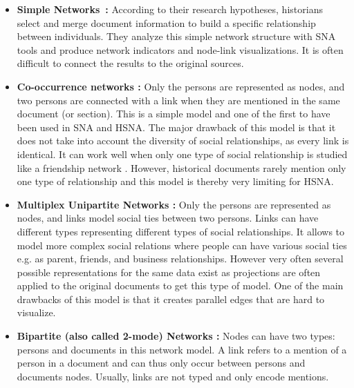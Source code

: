 \begin{itemize}[nosep,leftmargin=*]
    \item \textbf{Simple Networks~\cite{wetherellHistoricalSocialNetwork1998}:} According to their research hypotheses, historians select and merge document information to build a specific relationship between individuals. They analyze this simple network structure with SNA tools and produce network indicators and node-link visualizations. It is often difficult to connect the results to the original sources.
    \item \textbf{Co-occurrence networks \cite{sairioMethodologicalPracticalAspects2009}:}
    Only the persons are represented as nodes, and two persons are connected with a link when they are mentioned in the same document (or section).
    This is a simple model and one of the first to have been used in SNA and HSNA. The major drawback of this model is that it does not take into account the diversity of social relationships, as every link is identical. It can work well when only one type of social relationship is studied like a friendship network \cite{morenoFoundationsSociometryIntroduction1941}. However, historical documents rarely mention only one type of relationship and this model is thereby very limiting for HSNA.
    \item \textbf{Multiplex Unipartite Networks \cite{eriksonMalfeasanceFoundationsGlobal2006}:} Only the persons are represented as nodes, and links model social ties between two persons. Links can have different types representing different types of social relationships. It allows to model more complex social relations where people can have various social ties e.g. as parent, friends, and business relationships. However very often several possible representations for the same data exist as projections are often applied to the original documents to get this type of model. One of the main drawbacks of this model is that it creates parallel edges that are hard to visualize.
    \item \textbf{Bipartite (also called 2-mode) Networks
    \cite{hambergerScanningPatternsRelationship2014}
    :} Nodes can have two types: persons and documents in this network model. A link refers to a mention of a person in a document and can thus only occur between persons and documents nodes. Usually, links are not typed and only encode mentions.

\end{itemize}
